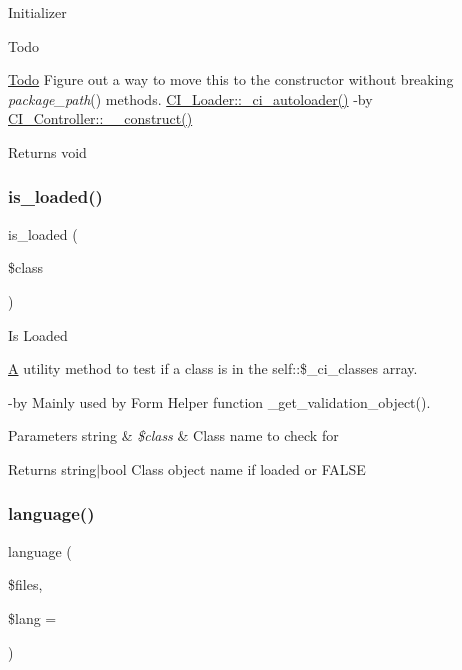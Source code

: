 Initializer

\begin{DoxyRefDesc}{Todo}
\item[\mbox{\hyperlink{todo__todo000001}{Todo}}]Figure out a way to move this to the constructor without breaking {\itshape package\+\_\+path}() methods.  \mbox{\hyperlink{class_c_i___loader_a93471c04ea0689dcf8faa5903d201efe}{C\+I\+\_\+\+Loader\+::\+\_\+ci\+\_\+autoloader()}} -\/by \mbox{\hyperlink{class_c_i___controller_a095c5d389db211932136b53f25f39685}{C\+I\+\_\+\+Controller\+::\+\_\+\+\_\+construct()}} \end{DoxyRefDesc}
\begin{DoxyReturn}{Returns}
void 
\end{DoxyReturn}
\mbox{\label{class_c_i___loader_a57ba1b43ec1d58c07a2d1e8cd00b9658}} 
\subsubsection{\texorpdfstring{is\+\_\+loaded()}{is\_loaded()}}
{\footnotesize\ttfamily is\+\_\+loaded (\begin{DoxyParamCaption}\item[{}]{\$class }\end{DoxyParamCaption})}

Is Loaded

\mbox{\hyperlink{class_a}{A}} utility method to test if a class is in the self\+::\$\+\_\+ci\+\_\+classes array.

-\/by Mainly used by Form Helper function \+\_\+get\+\_\+validation\+\_\+object().


\begin{DoxyParams}[1]{Parameters}
string & {\em \$class} & Class name to check for \\
\hline
\end{DoxyParams}
\begin{DoxyReturn}{Returns}
string$\vert$bool Class object name if loaded or F\+A\+L\+SE 
\end{DoxyReturn}
\mbox{\label{class_c_i___loader_ae3e44c33f5f085ad8d6c556ede1385d8}} 
\subsubsection{\texorpdfstring{language()}{language()}}
{\footnotesize\ttfamily language (\begin{DoxyParamCaption}\item[{}]{\$files,  }\item[{}]{\$lang = {\ttfamily \textquotesingle{}\textquotesingle{}} }\end{DoxyParamCaption})}

